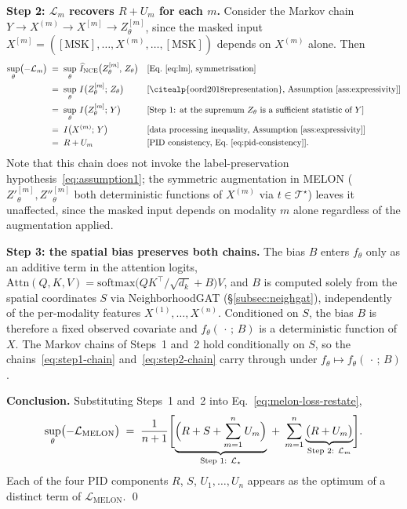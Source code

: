 \documentclass{article}
\theoremstyle{plain}
\theoremstyle{definition}
\begin{document}
\textbf{Step 2: $\mathcal{L}_{m}$ recovers $R + U_m$ for each $m$.}
Consider the Markov chain $Y \to X^{(m)} \to X^{[m]} \to Z^{[m]}_\theta$, since the masked input $X^{[m]} = ([\mathrm{MSK}], \ldots, X^{(m)}, \ldots, [\mathrm{MSK}])$ depends on $X^{(m)}$ alone. Then
\begin{equation}\label{eq:step2-chain}
\begin{aligned}
\sup_{\theta} \bigl(-\mathcal{L}_{m}\bigr)
  \;&=\; \sup_{\theta}\, \widehat{I}_{\mathrm{NCE}}\bigl(Z^{[m]}_\theta,\, Z_\theta\bigr)
    && \text{[Eq.~\eqref{eq:lm}, symmetrisation]} \\
  \;&=\; \sup_{\theta}\, I\bigl(Z^{[m]}_\theta;\, Z_\theta\bigr)
    && \text{[\citealp{oord2018representation}, Assumption~\ref{ass:expressivity}]} \\
  \;&=\; \sup_{\theta}\, I\bigl(Z^{[m]}_\theta;\, Y\bigr)
    && \text{[Step 1: at the supremum $Z_\theta$ is a sufficient statistic of $Y$]} \\
  \;&=\; I\bigl(X^{(m)};\, Y\bigr)
    && \text{[data processing inequality, Assumption~\ref{ass:expressivity}]} \\
  \;&=\; R + U_m
    && \text{[PID consistency, Eq.~\eqref{eq:pid-consistency}]}.
\end{aligned}
\end{equation}
Note that this chain does not invoke the label-preservation hypothesis~\eqref{eq:assumption1}; the symmetric augmentation in MELON ($Z'^{[m]}_\theta, Z''^{[m]}_\theta$ both deterministic functions of $X^{(m)}$ via $t \in \mathcal{T}^\star$) leaves it unaffected, since the masked input depends on modality $m$ alone regardless of the augmentation applied.

\textbf{Step 3: the spatial bias preserves both chains.}
The bias $B$ enters $f_\theta$ only as an additive term in the attention logits, $\mathrm{Attn}(Q, K, V) = \mathrm{softmax}\bigl(QK^\top/\sqrt{d_k} + B\bigr)V$, and $B$ is computed solely from the spatial coordinates $S$ via NeighborhoodGAT (\S\ref{subsec:neighgat}), independently of the per-modality features $X^{(1)}, \ldots, X^{(n)}$. Conditioned on $S$, the bias $B$ is therefore a fixed observed covariate and $f_\theta(\,\cdot\,;\, B)$ is a deterministic function of $X$. The Markov chains of Steps~1 and~2 hold conditionally on $S$, so the chains~\eqref{eq:step1-chain} and~\eqref{eq:step2-chain} carry through under $f_\theta \mapsto f_\theta(\,\cdot\,;\, B)$.

\textbf{Conclusion.} Substituting Steps~1 and~2 into Eq.~\eqref{eq:melon-loss-restate},
\begin{equation}\label{eq:final}
\sup_{\theta} \bigl(-\mathcal{L}_{\mathrm{MELON}}\bigr)
  \;=\; \frac{1}{n+1}\Biggl[
    \underbrace{\Bigl(R + S + \sum_{m=1}^{n} U_m\Bigr)}_{\text{Step 1: } \mathcal{L}_{\star}}
    \;+\;
    \sum_{m=1}^{n} \underbrace{\bigl(R + U_m\bigr)}_{\text{Step 2: } \mathcal{L}_{m}}
  \Biggr].
\end{equation}
Each of the four PID components $R$, $S$, $U_1, \ldots, U_n$ appears as the optimum of a distinct term of $\mathcal{L}_{\mathrm{MELON}}$. \qed
\end{document}
